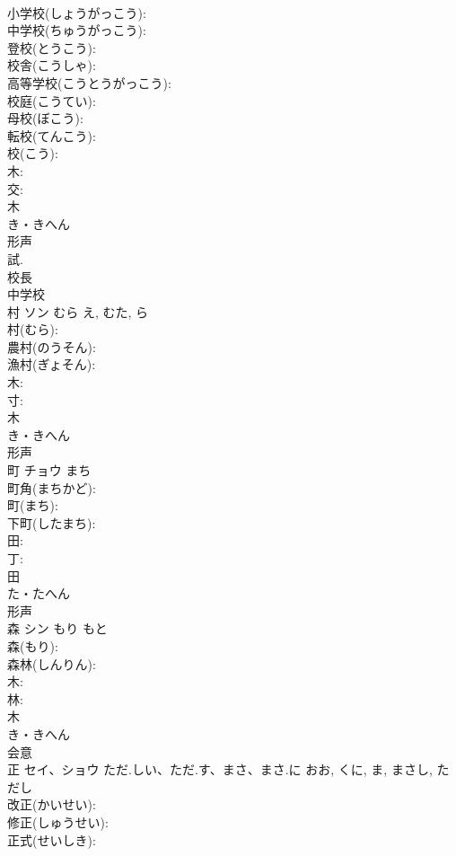 \documentclass[8pt]{extreport}
\begin{document}
\begin{CJK}{UTF8}{min}
\\	小学校(しょうがっこう): 
\\	中学校(ちゅうがっこう): 
\\	登校(とうこう): 
\\	校舎(こうしゃ): 
\\	高等学校(こうとうがっこう): 
\\	校庭(こうてい): 
\\	母校(ぼこう): 
\\	転校(てんこう): 
\\	校(こう): 
\\	木: 
\\	交: 
\\	木	
\\	き・きへん	
\\	形声 
\\	試.	
\\	校長 
\\	中学校 
\\	村	ソン	むら	え, むた, ら	
\\	村(むら): 
\\	農村(のうそん): 
\\	漁村(ぎょそん): 
\\	木: 
\\	寸: 
\\	木	
\\	き・きへん	
\\	形声 
\\	町	チョウ	まち		
\\	町角(まちかど): 
\\	町(まち): 
\\	下町(したまち): 
\\	田: 
\\	丁: 
\\	田	
\\	た・たへん	
\\	形声 
\\	森	シン	もり	もと	
\\	森(もり): 
\\	森林(しんりん): 
\\	木: 
\\	林: 
\\	木	
\\	き・きへん	
\\	会意 
\\	正	セイ、ショウ	ただ.しい、ただ.す、まさ、まさ.に	おお, くに, ま, まさし, ただし	
\\	改正(かいせい): 
\\	修正(しゅうせい): 
\\	正式(せいしき): 

\end{CJK}
\end{document}
